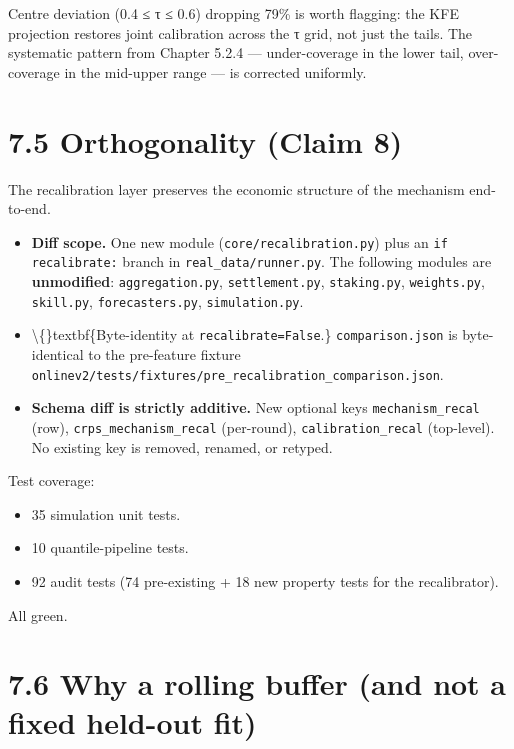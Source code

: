 \documentclass[11pt,a4paper,openany]{report}
\begin{document}
Centre deviation (0.4 ≤ τ ≤ 0.6) dropping 79\% is worth flagging: the
KFE projection restores joint calibration across the τ grid, not just
the tails. The systematic pattern from Chapter 5.2.4 — under-coverage
in the lower tail, over-coverage in the mid-upper range — is corrected
uniformly.

\section{7.5 Orthogonality (Claim 8)}

The recalibration layer preserves the economic structure of the
mechanism end-to-end.

\begin{itemize}
  \item \textbf{Diff scope.} One new module (\texttt{core/recalibration.py}) plus an
    \texttt{if recalibrate:} branch in \texttt{real\_data/runner.py}. The following
    modules are \textbf{unmodified}: \texttt{aggregation.py}, \texttt{settlement.py},
    \texttt{staking.py}, \texttt{weights.py}, \texttt{skill.py}, \texttt{forecasters.py},
    \texttt{simulation.py}.
  \item \textbackslash\{\}textbf\{Byte-identity at \texttt{recalibrate=False}.\} \texttt{comparison.json} is
    byte-identical to the pre-feature fixture
    \texttt{onlinev2/tests/fixtures/pre\_recalibration\_comparison.json}.
  \item \textbf{Schema diff is strictly additive.} New optional keys
    \texttt{mechanism\_recal} (row), \texttt{crps\_mechanism\_recal} (per-round),
    \texttt{calibration\_recal} (top-level). No existing key is removed,
    renamed, or retyped.
\end{itemize}

Test coverage:

\begin{itemize}
  \item 35 simulation unit tests.
  \item 10 quantile-pipeline tests.
  \item 92 audit tests (74 pre-existing + 18 new property tests for the
    recalibrator).
\end{itemize}

All green.

\section{7.6 Why a rolling buffer (and not a fixed held-out fit)}
\end{document}
